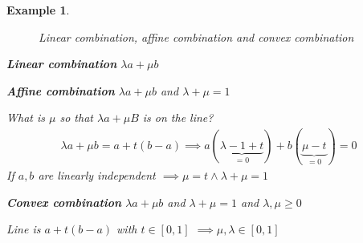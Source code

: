 \documentclass[]{article}
\newtheorem{example}{Example}
\begin{document}
\begin{example}
	\begin{figure}[h!]
		\caption{Linear combination, affine combination and convex combination}
		\label{fig:combinationexample}
	\end{figure}
	
	\textbf{Linear combination} $\lambda a + \mu b$

	\textbf{Affine combination} $\lambda a + \mu b$ and $\lambda + \mu = 1$
	
	What is $\mu$ so that $\lambda a + \mu B$ is on the line?
	\begin{align*}
		\lambda a + \mu b = a + t(b-a) \implies a (\underbrace{\lambda - 1 + t}_{=0}) + b (\underbrace{\mu - t}_{=0}) = 0
	\end{align*}
	If $a,b$ are linearly independent $\implies \mu = t \land \lambda + \mu = 1$

	\textbf{Convex combination} $\lambda a + \mu b$ and $\lambda + \mu = 1$ and $\lambda,\mu \geq 0$
	
	Line is $a + t(b-a)$ with $t\in[0,1]$ $\implies \mu,\lambda \in [0,1]$
\end{example}
\end{document}
